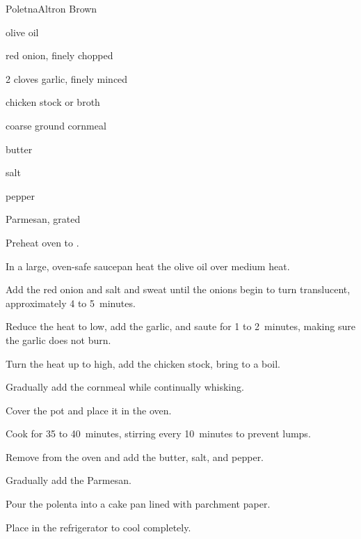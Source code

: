 \begin{recipe}{Poletna}{Altron Brown}{}

\begin{ingredients}
\item {} olive oil
\item \C{\threequarter} red onion, finely chopped
\item 2 cloves garlic, finely minced 
\item {} chicken stock or broth 
\item {} coarse ground cornmeal 
\item {} butter 
\item \tp{1\half} salt 
\item \tp{\quarter} pepper 
\item \C{\third} Parmesan, grated
\end{ingredients}

\begin{directions}
\item Preheat oven to . 
\item In a large, oven-safe saucepan heat the olive oil over medium heat.
\item Add the red onion and salt and sweat until the onions begin to turn translucent, approximately 4 to 5~minutes.
\item Reduce the heat to low, add the garlic, and saute for 1 to 2~minutes, making sure the garlic does not burn.
\item Turn the heat up to high, add the chicken stock, bring to a boil.
\item Gradually add the cornmeal while continually whisking.
\item Cover the pot and place it in the oven.
\item Cook for 35 to 40~minutes, stirring every 10~minutes to prevent lumps.
\item Remove from the oven and add the butter, salt, and pepper.
\item Gradually add the Parmesan. 
\item Pour the polenta into a cake pan lined with parchment paper.
\item Place in the refrigerator to cool completely. 
\end{directions}
\end{recipe}
